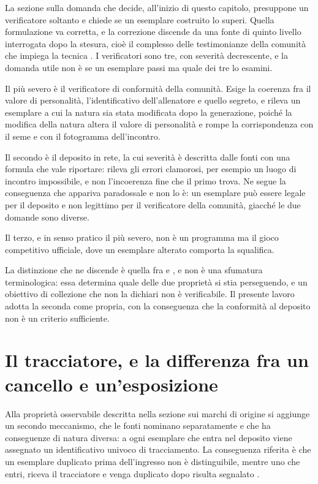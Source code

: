 La sezione sulla domanda che decide, all'inizio di questo capitolo, presuppone un verificatore soltanto e chiede se un esemplare costruito lo superi. Quella formulazione va corretta, e la correzione discende da una fonte di quinto livello interrogata dopo la stesura, cioè il complesso delle testimonianze della comunità che impiega la tecnica \cite{mankeymite-server}. I verificatori sono tre, con severità decrescente, e la domanda utile non è se un esemplare passi ma quale dei tre lo esamini.

Il più severo è il verificatore di conformità della comunità. Esige la coerenza fra il valore di personalità, l'identificativo dell'allenatore e quello segreto, e rileva un esemplare a cui la natura sia stata modificata dopo la generazione, poiché la modifica della natura altera il valore di personalità e rompe la corrispondenza con il seme e con il fotogramma dell'incontro.

Il secondo è il deposito in rete, la cui severità è descritta dalle fonti con una formula che vale riportare: rileva gli errori clamorosi, per esempio un luogo di incontro impossibile, e non l'incoerenza fine che il primo trova. Ne segue la conseguenza che appariva paradossale e non lo è: un esemplare può essere legale per il deposito e non legittimo per il verificatore della comunità, giacché le due domande sono diverse.

Il terzo, e in senso pratico il più severo, non è un programma ma il gioco competitivo ufficiale, dove un esemplare alterato comporta la squalifica.

La distinzione che ne discende è quella fra  e , e non è una sfumatura terminologica: essa determina quale delle due proprietà si stia perseguendo, e un obiettivo di collezione che non la dichiari non è verificabile. Il presente lavoro adotta la seconda come propria, con la conseguenza che la conformità al deposito non è un criterio sufficiente.

\section{Il tracciatore, e la differenza fra un cancello e un'esposizione}

Alla proprietà osservabile descritta nella sezione sui marchi di origine si aggiunge un secondo meccanismo, che le fonti nominano separatamente e che ha conseguenze di natura diversa: a ogni esemplare che entra nel deposito viene assegnato un identificativo univoco di tracciamento. La conseguenza riferita è che un esemplare duplicato prima dell'ingresso non è distinguibile, mentre uno che entri, riceva il tracciatore e venga duplicato dopo risulta segnalato \cite{mankeymite-server}.

